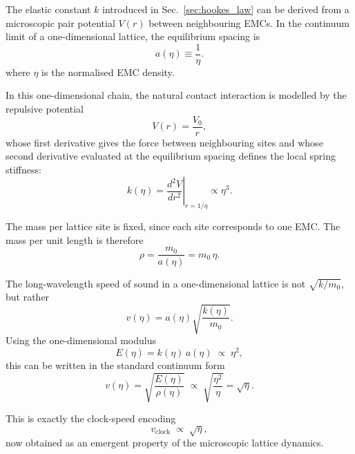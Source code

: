 \documentclass[10pt,a4paper]{article}
\begin{document}
The elastic constant \(k\) introduced in Sec.~\ref{sec:hookes_law}
can be derived from a microscopic pair potential \(V(r)\) between
neighbouring EMCs. In the continuum limit of a one-dimensional
lattice, the equilibrium spacing is
\begin{equation}
	a(\eta)
	\equiv
	\frac{1}{\eta}
	.
	\label{eq:a_eta}
\end{equation}
where \(\eta\) is the normalised EMC density.

In this one-dimensional chain, the natural contact interaction is
modelled by the repulsive potential
\begin{equation}
	V(r)
	=
	\frac{V_0}{r}
	,
\end{equation}
whose first derivative gives the force between neighbouring sites and
whose second derivative evaluated at the equilibrium spacing defines
the local spring stiffness:
\begin{equation}
	k(\eta)
	=
	\left.
	\frac{d^{2}V}{dr^{2}}
	\right|_{r=1/\eta}
	\propto
	\eta^{3}
	.
\end{equation}

The mass per lattice site is fixed, since each site corresponds to one
EMC. The mass per unit length is therefore
\begin{equation}
	\rho
	=
	\frac{m_0}{a(\eta)}
	=
	m_0\,\eta
	.
\end{equation}

The long-wavelength speed of sound in a one-dimensional lattice is not
\(\sqrt{k/m_0}\), but rather
\begin{equation}
	v(\eta)
	=
	a(\eta)
	\sqrt{\frac{k(\eta)}{m_0}}
	.
\end{equation}
Using the one-dimensional modulus
\begin{equation}
	E(\eta)
	=
	k(\eta)\,a(\eta)
	\;\propto\;
	\eta^{2}
	,
\end{equation}
this can be written in the standard continuum form
\begin{equation}
	v(\eta)
	=
	\sqrt{\frac{E(\eta)}{\rho(\eta)}}
	\;\propto\;
	\sqrt{\frac{\eta^{2}}{\eta}}
	=
	\sqrt{\eta}
	.
\end{equation}

This is exactly the clock-speed encoding
\begin{equation}
	v_{\text{clock}}
	\;\propto\;
	\sqrt{\eta}
	,
\end{equation}
now obtained as an emergent property of the microscopic lattice
dynamics.
\end{document}

